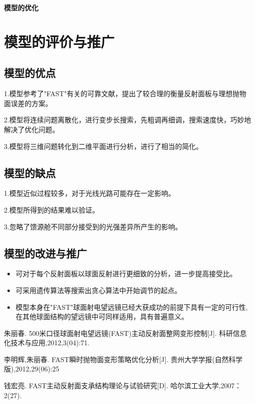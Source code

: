 \documentclass[withoutpreface,bwprint]{cumcmthesis} %
\begin{document}
      



  
\textbf{模型的优化} 




\section{模型的评价与推广}

\subsection{模型的优点}

1.模型参考了"FAST"有关的可靠文献，提出了较合理的衡量反射面板与理想抛物面误差的方案。

2.模型将连续问题离散化，进行变步长搜索，先粗调再细调，搜索速度快，巧妙地解决了优化问题。

3.模型将三维问题转化到二维平面进行分析，进行了相当的简化。

\subsection{模型的缺点}

1.模型近似过程较多，对于光线光路可能存在一定影响。

2.模型所得到的结果难以验证。

3.忽略了馈源舱不同部分接受到的光强差异所产生的影响。

\subsection{模型的改进与推广}

\begin{itemize}
\item 可对于每个反射面板以球面反射进行更细致的分析，进一步提高接受比。
\item 可采用遗传算法等搜索出贪心算法中开始调节的起点。
\item 模型本身在"FAST"球面射电望远镜已经大获成功的前提下具有一定的可行性,
在其他球面结构的望远镜中可同样适用，具有普遍意义。
\end{itemize}



\newpage
    \begin{thebibliography}{9}%
        \bibitem [1] 
        \newblock 朱丽春.
        \newblock 500米口径球面射电望远镜(FAST)主动反射面整网变形控制[J].
        \newblock 科研信息化技术与应用,2012,3(04):71.

        \bibitem [2] 
        \newblock 李明辉,朱丽春.
        \newblock FAST瞬时抛物面变形策略优化分析[J].
        \newblock 贵州大学学报(自然科学版),2012,29(06):25

        \bibitem [3] 
        \newblock 钱宏亮.
        \newblock FAST主动反射面支承结构理论与试验研究[D].
        \newblock 哈尔滨工业大学,2007：2(27).
       


    \end{thebibliography}
\end{document}
